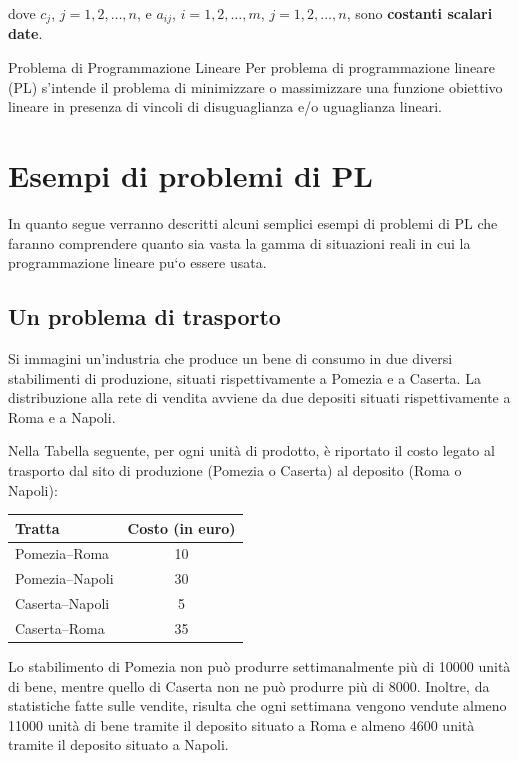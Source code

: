 dove $c_j$, $j=1,2,\ldots,n$, e $a_{ij}$, $i=1,2,\ldots,m$, $j=1,2,\ldots,n$, sono \textbf{costanti scalari date}.

\begin{definition}{Problema di Programmazione Lineare}
Per problema di programmazione lineare (PL) s'intende
il problema di minimizzare o massimizzare una funzione obiettivo lineare in
presenza di vincoli di disuguaglianza e/o uguaglianza lineari.
\end{definition}

\newpage
\section{Esempi di problemi di PL}
In quanto segue verranno descritti alcuni semplici esempi di problemi di PL
che faranno comprendere quanto sia vasta la gamma di situazioni reali in
cui la programmazione lineare pu`o essere usata.
\subsection{Un problema di trasporto}

Si immagini un'industria che produce un bene di consumo in due diversi stabilimenti di produzione, situati rispettivamente a Pomezia e a Caserta. La distribuzione alla rete di vendita avviene da due depositi situati rispettivamente a Roma e a Napoli. 

Nella Tabella seguente, per ogni unità di prodotto, è riportato il costo legato al trasporto dal sito di produzione (Pomezia o Caserta) al deposito (Roma o Napoli):

\begin{table}[h]
\centering
\begin{tabular}{lc}
\toprule
\textbf{Tratta} & \textbf{Costo (in euro)} \\
\midrule
Pomezia--Roma & 10 \\
Pomezia--Napoli & 30 \\
Caserta--Napoli & 5 \\
Caserta--Roma & 35 \\
\bottomrule
\end{tabular}
\end{table}

Lo stabilimento di Pomezia non può produrre settimanalmente più di 10000 unità di bene, mentre quello di Caserta non ne può produrre più di 8000. Inoltre, da statistiche fatte sulle vendite, risulta che ogni settimana vengono vendute almeno 11000 unità di bene tramite il deposito situato a Roma e almeno 4600 unità tramite il deposito situato a Napoli.

